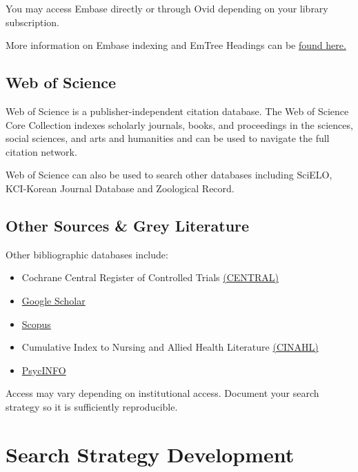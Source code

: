 \documentclass[
]{book}
\providecommand{\tightlist}{%
  \setlength{\itemsep}{0pt}\setlength{\parskip}{0pt}}
\begin{document}
You may access Embase directly or through Ovid depending on your library subscription.

More information on Embase indexing and EmTree Headings can be \href{https://www.elsevier.com/solutions/embase-biomedical-research/embase-coverage-and-content}{found here.}

\hypertarget{web-of-science}{%
\subsection{Web of Science}\label{web-of-science}}

Web of Science is a publisher-independent citation database. The Web of Science Core Collection indexes scholarly journals, books, and proceedings in the sciences, social sciences, and arts and humanities and can be used to navigate the full citation network.

Web of Science can also be used to search other databases including SciELO, KCI-Korean Journal Database and Zoological Record.

\hypertarget{other-sources-grey-literature}{%
\subsection{Other Sources \& Grey Literature}\label{other-sources-grey-literature}}

Other bibliographic databases include:

\begin{itemize}
\tightlist
\item
  Cochrane Central Register of Controlled Trials \href{https://www.cochranelibrary.com/central/about-central}{(CENTRAL)}
\item
  \href{https://scholar.google.com/}{Google Scholar}
\item
  \href{https://www.scopus.com/home.uri}{Scopus}
\item
  Cumulative Index to Nursing and Allied Health Literature \href{https://www.ebscohost.com/nursing/products/cinahl-databases/cinahl-complete}{(CINAHL)}
\item
  \href{https://www.apa.org/pubs/databases/psycinfo}{PsycINFO}
\end{itemize}

Access may vary depending on institutional access. Document your search strategy so it is sufficiently reproducible.

\hypertarget{search-strategy-development}{%
\section{Search Strategy Development}\label{search-strategy-development}}
\end{document}
